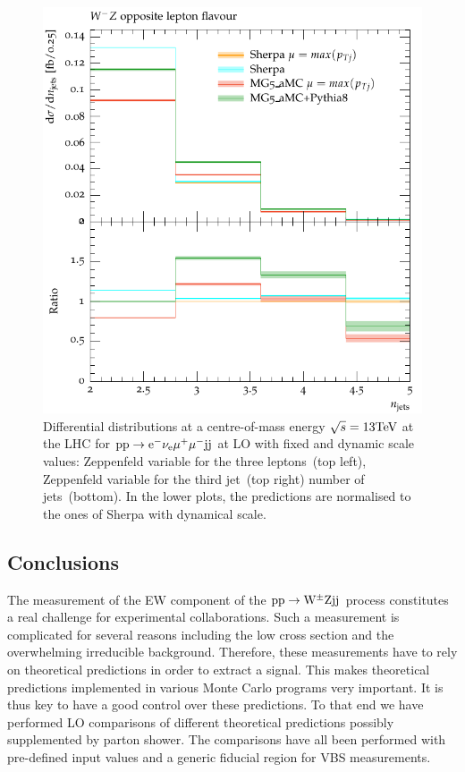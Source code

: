 \documentclass[11pt]{cernrep}
\begin{document}
\begin{figure}[htbp]
\begin{center}
   \includegraphics[scale=0.65]{figs/dyn_WmZ_OF_nJets}
\caption{Differential distributions at a centre-of-mass energy $\sqrt{s}=13{\rm TeV}$ at the LHC for ${\rm p} {\rm p} \to {\rm e}^-  \nu_{\rm e}  \mu^+ \mu^- {\rm j} {\rm j}$ at LO with fixed and dynamic scale values: 
                Zeppenfeld variable for the three leptons~(top left),
                Zeppenfeld variable for the third jet~(top right)
                number of jets~(bottom).
                In the lower plots, the predictions are normalised to the ones of {\sc Sherpa} with dynamical scale.
                }
\label{vbs_fig_shower_2b}
\end{center}
\end{figure}

\subsection{Conclusions \label{vbs_concl}}

The measurement of the EW component of the ${\rm p}{\rm p} \to {\rm W}^{\pm}{\rm Z}{\rm j}{\rm j}$ process constitutes a real challenge for experimental collaborations.
Such a measurement is complicated for several reasons including the low cross section and the overwhelming irreducible background.
Therefore, these measurements have to rely on theoretical predictions in order to extract a signal.
This makes theoretical predictions implemented in various Monte Carlo programs very important.
It is thus key to have a good control over these predictions.
To that end we have performed LO comparisons of different theoretical predictions possibly supplemented by parton shower.
The comparisons have all been performed with pre-defined input values and a generic fiducial region for VBS measurements.
\end{document}
